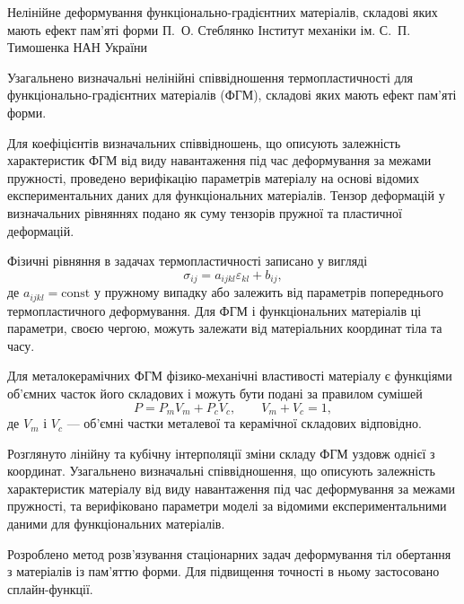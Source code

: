 \ReportHeading
  {Нелінійне деформування функціонально-градієнтних матеріалів, складові яких мають ефект пам’яті форми}
  {П.~О. Стеблянко}
  {Інститут механіки ім. С.~П. Тимошенка НАН України}
  {}

Узагальнено визначальні нелінійні співвідношення термопластичності для функціонально-градієнтних матеріалів (ФГМ), складові яких мають ефект пам’яті форми.

Для коефіцієнтів визначальних співвідношень, що описують залежність характеристик ФГМ від виду навантаження під час деформування за межами пружності, проведено верифікацію параметрів матеріалу на основі відомих експериментальних даних для функціональних матеріалів. Тензор деформацій у визначальних рівняннях подано як суму тензорів пружної та пластичної деформацій.

Фізичні рівняння в задачах термопластичності записано у вигляді
\begin{equation}
  \sigma_{ij}=a_{ijkl}\varepsilon_{kl}+b_{ij},
\end{equation}
де $a_{ijkl}=\mathrm{const}$ у пружному випадку або залежить від параметрів попереднього термопластичного деформування. Для ФГМ і функціональних матеріалів ці параметри, своєю чергою, можуть залежати від матеріальних координат тіла та часу.

Для металокерамічних ФГМ фізико-механічні властивості матеріалу є функціями об’ємних часток його складових і можуть бути подані за правилом сумішей
\begin{equation}
  P=P_mV_m+P_cV_c,
  \qquad V_m+V_c=1,
\end{equation}
де $V_m$ і $V_c$ --- об’ємні частки металевої та керамічної складових відповідно.

Розглянуто лінійну та кубічну інтерполяції зміни складу ФГМ уздовж однієї з координат. Узагальнено визначальні співвідношення, що описують залежність характеристик матеріалу від виду навантаження під час деформування за межами пружності, та верифіковано параметри моделі за відомими експериментальними даними для функціональних матеріалів.

Розроблено метод розв’язування стаціонарних задач деформування тіл обертання з матеріалів із пам’яттю форми. Для підвищення точності в ньому застосовано сплайн-функції.
